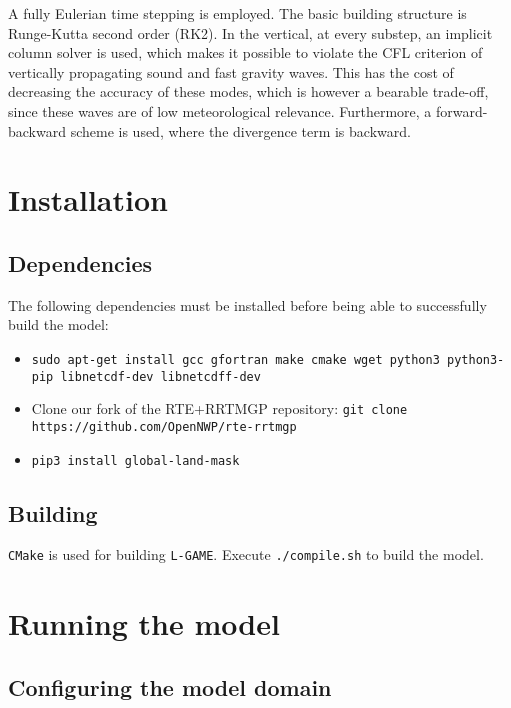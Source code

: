 \documentclass[10pt]{report}
\begin{document}
A fully Eulerian time stepping is employed. The basic building structure is Runge-Kutta second order (RK2). In the vertical, at every substep, an implicit column solver is used, which makes it possible to violate the CFL criterion of vertically propagating sound and fast gravity waves. This has the cost of decreasing the accuracy of these modes, which is however a bearable trade-off, since these waves are of low meteorological relevance. Furthermore, a forward-backward scheme is used, where the divergence term is backward.

\chapter{Installation}
\label{chap:installation}

\section{Dependencies}
\label{sec:dependencies}

The following dependencies must be installed before being able to successfully build the model:

\begin{itemize}
\item \texttt{sudo apt-get install gcc gfortran make cmake wget python3 python3-pip libnetcdf-dev libnetcdff-dev}
\item Clone our fork of the RTE+RRTMGP repository: \texttt{git clone https://github.com/OpenNWP/rte-rrtmgp}
\item \texttt{pip3 install global-land-mask}
\end{itemize}

\section{Building}
\label{sec:building}

\texttt{CMake} is used for building \texttt{L-GAME}. Execute \texttt{./compile.sh} to build the model.

\chapter{Running the model}
\label{chap:running_the_model}

\section{Configuring the model domain}
\label{sec:configuring_the_model_domain}
\end{document}

